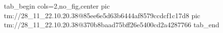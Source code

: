  
 
 
 
 

\qqSecOrig


\ifcmt
  tab_begin cols=2,no_fig,center
    pic tm://28_11_22.10.20.38@85ee6e5d63b6444af8579ccdcf1c17d8
    pic tm://28_11_22.10.20.38@370b8baad75bff26e5400cd2a4287766
  tab_end
\fi

